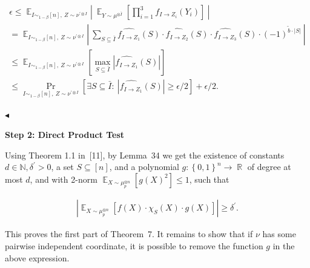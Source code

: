 \[\begin{gathered}
\displaystyle\epsilon \displaystyle\leqslant\mathop{\mathbb{E}}_{I\sim_{1-\beta}[n],\ Z\sim\nu^{\prime\otimes I}}\left|\ \mathop{\mathbb{E}}_{Y\sim\mu^{\otimes\bar{I}}}\left[\prod_{i=1}^{3}f_{I\to Z_{i}}(Y_{i})\right]\ \right| \\
\displaystyle=\mathop{\mathbb{E}}_{I\sim_{1-\beta}[n],\ Z\sim\nu^{\prime\otimes I}}\left|\ \sum_{S\subseteq\bar{I}}\widehat{f_{I\to Z_{1}}}(S)\cdot\widehat{f_{I\to Z_{2}}}(S)\cdot\widehat{f_{I\to Z_{3}}}(S)\cdot(-1)^{\tilde{b}\cdot\left|S\right|}\ \right| \\
\displaystyle\leqslant\mathop{\mathbb{E}}_{I\sim_{1-\beta}[n],\ Z\sim\nu^{\prime\otimes I}}\left[\max_{S\subseteq\bar{I}}\left|\widehat{f_{I\to Z_{1}}}(S)\right|\right] \\
\displaystyle\leqslant\Pr_{I\sim_{1-\beta}[n],\ Z\sim\nu^{\prime\otimes I}}\left[\exists S\subseteq\bar{I}:\ \left|\widehat{f_{I\to Z_{1}}}(S)\right|\geqslant\epsilon/2\right]+\epsilon/2.\
\end{gathered}\]


$\blacktriangleleft$\par






\par\medskip\noindent\textbf{Step 2: Direct Product Test}\par




Using Theorem 1.1 in [11], by Lemma 34 we get the existence of constants $d\in\mathbb{N},\delta^{\prime}>0$, a set $S\subseteq[n]$, and a polynomial $g:\left\{0,1\right\}^{n}\to\mathop{\mathbb{R}}$ of degree at most $d$, and with 2-norm $\mathop{\mathbb{E}}_{X\sim\mu_{p}^{\otimes n}}\left[g(X)^{2}\right]\leqslant 1$, such that\par


\[\begin{gathered}
\left|\mathop{\mathbb{E}}_{X\sim\mu_{p}^{\otimes n}}\left[f(X)\cdot\chi_{S}(X)\cdot g(X)\right]\right|\geqslant\delta^{\prime}.
\end{gathered}\]




This proves the first part of Theorem 7.
It remains to show that if $\nu$ has some pairwise independent coordinate, it is possible to remove the function $g$ in the above expression.\par





